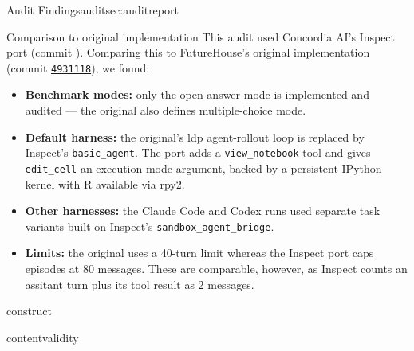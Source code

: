 \begin{maincontentstyled}
\begin{reportpart}{Audit Findings}{audit}{sec:auditreport}
\begin{dsbox}{Comparison to original implementation}
\noindent This audit used Concordia AI's Inspect port (commit
\ccommitref). Comparing this to FutureHouse's original implementation (commit \href{https://github.com/Future-House/BixBench/commit/49311180bdacb324c596f2e07596c126f2004008}{\texttt{4931118}}), we found:
\begin{itemize}\setlength{\itemsep}{2pt}
  \item \textbf{Benchmark modes:} only the open-answer mode is implemented and audited --- the original also defines multiple-choice mode.
  \item \textbf{Default harness:} the original's ldp agent-rollout loop is replaced by Inspect's \texttt{basic\_agent}. The port adds a \texttt{view\_notebook} tool and gives \texttt{edit\_cell} an execution-mode argument, backed by a persistent IPython kernel with R available via rpy2.
  \item \textbf{Other harnesses:} the Claude Code and Codex runs used
    separate task variants built on Inspect's \texttt{sandbox\_agent\_bridge}.
  \item \textbf{Limits:} the original uses a 40-turn limit whereas the Inspect port caps episodes at 80 messages. These are comparable, however, as Inspect counts an assitant turn plus its tool result as 2 messages.
\end{itemize}
\end{dsbox}



\begin{dimensionreport}{construct}
\end{dimensionreport}

\begin{dimensionreport}{contentvalidity}
\end{dimensionreport}


\end{reportpart}
\end{maincontentstyled}
